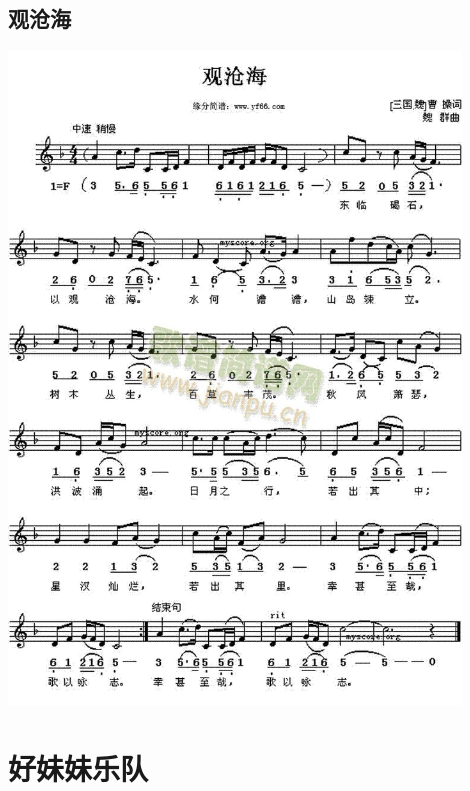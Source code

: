 \documentclass[cn,pad,twocol]{elegantbook}
\begin{document}
\section{观沧海}    \includegraphics[width=0.9\textwidth]{dongxiao/20200808-观沧海-曹操.jpg}                             

\chapter{好妹妹乐队}
\end{document}
